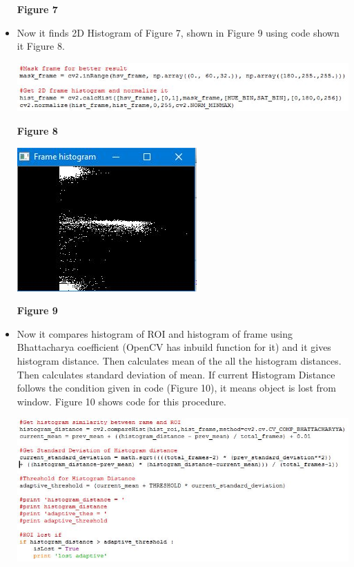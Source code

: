 \documentclass[11pt,a4paper]{article}
\begin{document}
\begin{itemize}
\begin{center}
			 	\end{center}
			 	\begin{center}
			 		\textbf{Figure 7}
			 	\end{center}
			 \item Now it finds 2D Histogram of Figure 7, shown in Figure 9 using code shown it Figure 8.
				 \begin{center}
				 	\includegraphics[scale=0.8]{frame_hist_code.JPG}
				 \end{center}
				 \begin{center}
				 	\textbf{Figure 8}
				 \end{center}
				 \begin{center}
				 	\includegraphics[scale=0.8]{frame_histogram.JPG}
				 \end{center}
				 \begin{center}
				 	\textbf{Figure 9}
				 \end{center}
			 \item Now it compares histogram of ROI and histogram of frame using Bhattacharya coefficient (OpenCV has inbuild function for it) and it gives histogram distance. Then calculates mean of the all the histogram distances. Then calculates standard deviation of mean. If current Histogram Distance follows the condition given in code (Figure 10), it means object is lost from window. Figure 10 shows code for this procedure.
				 \begin{center}
				 	\includegraphics[scale=0.8]{code_histogram_comparison.JPG}

\end{center}
\end{itemize}
\end{document}
